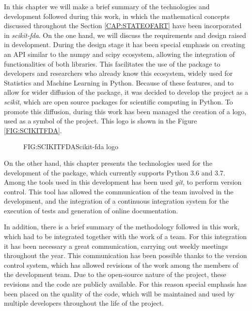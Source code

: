 
In this chapter we will make a brief summary of the technologies and development
followed during this work, in which the mathematical concepts discussed
throughout the Section \ref{CAP:STATEOFART} have been incorporated in
\textit{scikit-fda}. On the one hand, we will discuss the requirements and
design raised in development. During the design stage it has been special
emphasis on creating an \acs{API} similar to the numpy and scipy ecosystem, allowing
the integration of functionalities of both libraries. This facilitates the use
of the package to developers and researchers who already know this ecosystem,
widely used for Statistics and Machine Learning in Python. Because of these
features, and to allow for wider diffusion of the package, it was decided to
develop the project as a \textit{scikit}, which are open source packages for
scientific computing in Python.
To promote this diffusion, during this work has been managed the creation of a
logo, used as a symbol of the project. This logo is shown in the Figure
\ref{FIG:SCIKITFDA}.

\begin{figure}[Scikit-fda logo]{FIG:SCIKITFDA}{Scikit-fda logo}
\end{figure}

On the other hand, this chapter presents the technologies used for the development of
the package, which currently supports Python 3.6 and 3.7.
Among the tools used in this development has been used \textit{git},
to perform version control. This tool has allowed the communication of the team
involved in the development, and the integration of a continuous integration
system for the execution of tests and generation of online documentation.

In addition, there is a brief summary of the methodology followed in this work,
which had to be integrated together with the work of a team.
For this integration it has been necessary a great communication,
carrying out weekly meetings throughout the year. This communication has
been possible thanks to the version control system, which has allowed
revisions of the work among the members of the development team.
Due to the open-source nature of the project, these revisions and the code
are publicly available. For this reason special emphasis has been placed on
the quality of the code, which will be maintained and used by multiple
developers throughout the life of the project.
